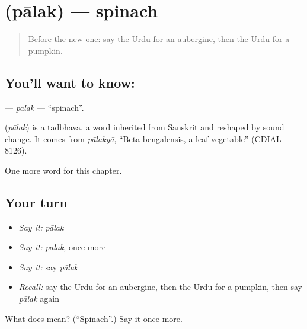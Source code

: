 \section[\texorpdfstring{\ur{پالک} (pālak)}{پالک (pālak)}]{ (pālak) — spinach}

\label{lesson:UR-C226-palak2}



\begin{quote}
Before the new one: say the Urdu for an aubergine, then the Urdu for a pumpkin.
\end{quote}

\subsection*{You'll want to know: }
\textbf{} — \emph{pālak} — \textquotedblleft{}spinach\textquotedblright{}.

\begin{cousinweb}
\textbf{} (\emph{pālak}) is a tadbhava, a word inherited from Sanskrit and reshaped by sound change. It comes from \emph{pālakyā}, \textquotedblleft{}Beta bengalensis, a leaf vegetable\textquotedblright{} (CDIAL 8126).
\end{cousinweb}

\begin{grammarlens}[title={What you've built}]
One more word for this chapter.
\end{grammarlens}

\subsection*{Your turn}
\begin{itemize}
\raggedright
  \item \emph{Say it:} \emph{pālak}
  \item \emph{Say it:} \emph{pālak}, once more
  \item \emph{Say it:} say \emph{pālak}
  \item \emph{Recall:} say the Urdu for an aubergine, then the Urdu for a pumpkin, then say \emph{pālak} again
\end{itemize}

\begin{tcolorbox}[breakable,colback=teal!4,colframe=teal!35!black,title={Before you move on}]
What does  mean? (\textquotedblleft{}Spinach\textquotedblright{}.) Say it once more.
\end{tcolorbox}
